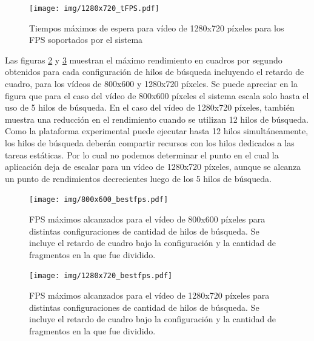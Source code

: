 \begin{figure}[!h]

	\texttt{[image: img/1280x720\_tFPS.pdf]}
	\caption{Tiempos máximos de espera para vídeo de 1280x720 píxeles para
	los FPS soportados por el sistema}
	\label{1280tFPS}

\end{figure}

Las figuras \ref{bestFPS800} y \ref{bestFPS1280} muestran el máximo rendimiento
en cuadros por segundo obtenidos para cada configuración de hilos de búsqueda
incluyendo el retardo de cuadro, para los vídeos de 800x600 y 1280x720 píxeles.
Se puede apreciar en la figura que para el caso del vídeo de 800x600 píxeles el
sistema escala solo hasta el uso de 5 hilos de búsqueda. En el caso del vídeo de
1280x720 píxeles, también muestra una reducción en el rendimiento cuando se
utilizan 12 hilos de búsqueda. Como la plataforma experimental puede ejecutar
hasta 12 hilos simultáneamente, los hilos de búsqueda deberán compartir recursos
con los hilos dedicados a las tareas estáticas. Por lo cual no podemos
determinar el punto en el cual la aplicación deja de escalar para un vídeo de
1280x720 píxeles, aunque se alcanza un punto de rendimientos decrecientes luego
de los 5 hilos de búsqueda.

\begin{figure}[!h]

	\texttt{[image: img/800x600\_bestfps.pdf]}
	\caption{FPS máximos alcanzados para el vídeo de 800x600 píxeles para
	distintas configuraciones de cantidad de hilos de búsqueda. Se incluye
	el retardo de cuadro bajo la configuración y la cantidad de fragmentos
	en la que fue dividido.} \label{bestFPS800}

\end{figure}

\begin{figure}[!h]

	\texttt{[image: img/1280x720\_bestfps.pdf]}
	\caption{FPS máximos alcanzados para el vídeo de 1280x720 píxeles para
	distintas configuraciones de cantidad de hilos de búsqueda. Se incluye
	el retardo de cuadro bajo la configuración y la cantidad de fragmentos
	en la que fue dividido.}
	\label{bestFPS1280}

\end{figure}

